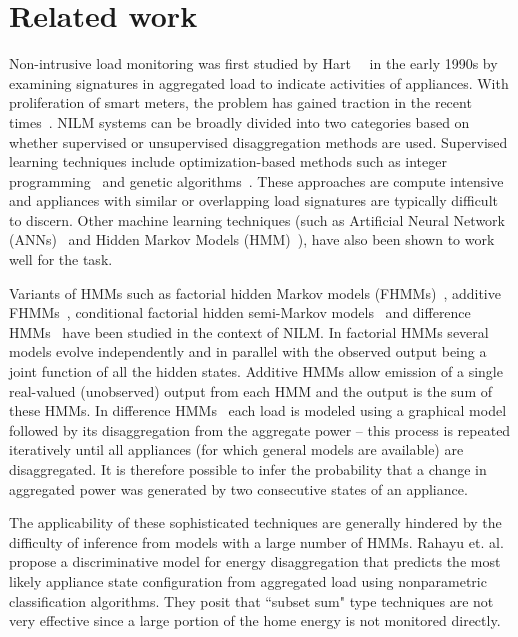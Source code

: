 \documentclass[conference]{IEEEtran}
\begin{document}
\vspace{-2mm}
\section{Related work}
\vspace{-1mm}
\noindent Non-intrusive load monitoring was first studied by Hart~~\cite{hart} in the early 1990s by examining signatures in aggregated load to indicate activities of appliances. With proliferation of smart meters, the problem has gained traction in the recent times~\cite{survey1,survey2,survey3}. NILM systems can be broadly divided into two categories based on whether supervised or unsupervised disaggregation methods are used.
\noindent Supervised learning techniques include optimization-based methods such as integer programming~\cite{Suzuki_08} and genetic algorithms~\cite{Baranski_04}. These approaches are compute intensive and appliances with similar or overlapping load signatures are typically difficult to discern. Other machine learning techniques (such as Artificial Neural Network (ANNs)~\cite{Ruzzelli_10} and Hidden Markov Models (HMM)~\cite{Zia_11}), have also been shown to work well for the task. 

\noindent Variants of HMMs such as factorial hidden Markov models (FHMMs)~\cite{Ghahramani_97a}, additive FHMMs~\cite{Kolter_12}, conditional factorial hidden semi-Markov models~\cite{Kim_11} and difference HMMs~\cite{parson2012_aaai} have been studied in the context of NILM. In factorial HMMs several models evolve independently and in parallel with the observed output being a joint function of all the hidden states. Additive HMMs allow emission of a single real-valued (unobserved) output from each HMM and the output is the sum of these HMMs. In difference HMMs~\cite{parson2012_aaai} each load is modeled using a graphical model followed by its disaggregation from the aggregate power -- this process is repeated iteratively until all appliances (for which general models are available) are disaggregated. It is therefore possible to infer the probability that a change in aggregated power was generated by two consecutive states of an appliance. 

\noindent The applicability of these sophisticated techniques are generally hindered by the difficulty of inference from models with a large number of HMMs. Rahayu et. al.~\cite{Rahayu_12} propose a discriminative model for energy disaggregation that predicts the most likely appliance state configuration from aggregated load using nonparametric classification algorithms. They posit that ``subset sum" type techniques are not very effective since a large portion of the home energy is not monitored directly. 
\end{document}
